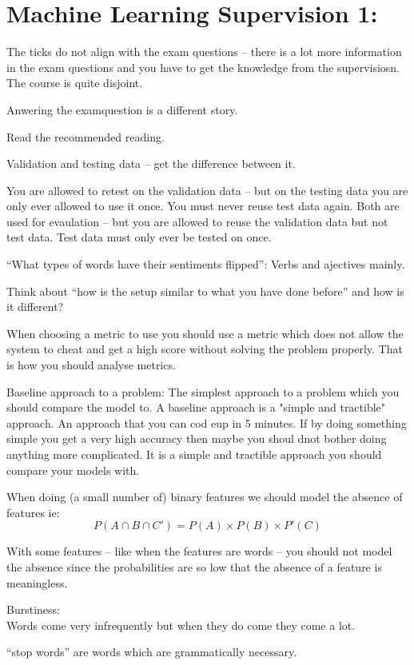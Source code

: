 \documentclass[10pt, a4paper]{article}
\begin{document}
\section*{Machine Learning Supervision 1:}

The ticks do not align with the exam questions -- there is a lot more information in the exam questions and you 
have to get the knowledge from the supervisiosn. The course is quite disjoint.

Anwering the examquestion is a different story.

Read the recommended reading.

Validation and testing data -- get the difference between it.

You are allowed to retest on the validation data -- but on the testing data 
you are only ever allowed to use it once. You must never reuse test data again.
Both are used for evaulation -- but you are allowed to reuse the validation data 
but not test data. Test data must only ever be tested on once.

``What types of words have their sentiments flipped'':
Verbs and ajectives mainly.

Think about ``how is the setup similar to what you have done before'' and how is it different?

When choosing a metric to use you should use a metric which does not allow the system to cheat and get a high score without solving the problem properly. That is how you should analyse metrics.

Baseline approach to a problem:
The simplest approach to a problem which you should compare the model to.
A baseline approach is a "simple and tractible" approach. An approach that you can cod eup in 5 minutes. If by doing something simple you get a very high accuracy then maybe you shoul dnot bother doing anything more complicated. It is a simple and tractible approach you should compare your models with.

When doing (a small number of) binary features we should model the absence of features ie:
\[
P(A\cap B\cap C') = P(A) \times P(B) \times P'(C)
\]

With some features -- like when the features are words -- you should not model the 
absence since the probabilities are so low that the absence of a feature is meaningless.

Burstiness:\\
Words come very infrequently but when they do come they come a lot.

``stop words'' are words which are grammatically necessary.
\end{document}
